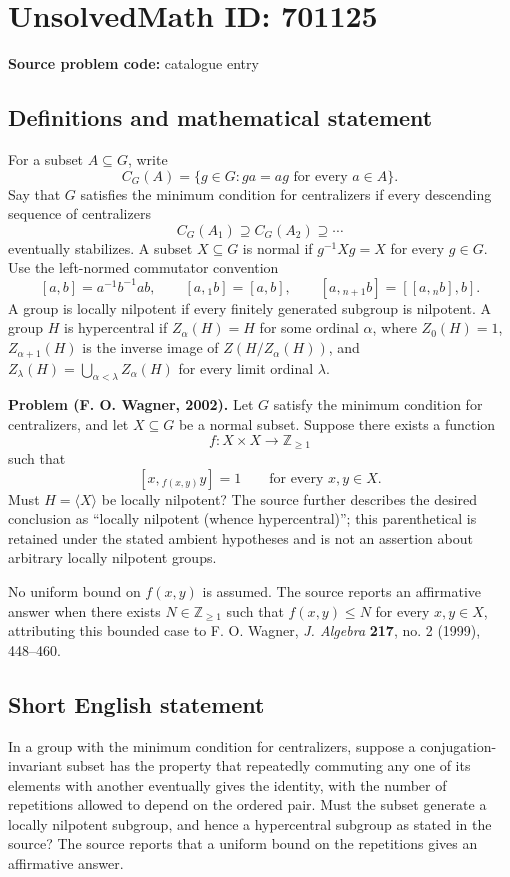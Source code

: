 \documentclass[11pt]{article}
\newcommand{\Z}{\mathbb{Z}}
\begin{document}
\section*{UnsolvedMath ID: 701125}
\textbf{Source problem code:} catalogue entry
\subsection{Definitions and mathematical statement}
For a subset \(A\subseteq G\), write
\[
C_G(A)=\{g\in G:ga=ag\text{ for every }a\in A\}.
\]
Say that \(G\) satisfies the minimum condition for centralizers if every descending sequence of centralizers
\[
C_G(A_1)\supseteq C_G(A_2)\supseteq\cdots
\]
eventually stabilizes. A subset \(X\subseteq G\) is normal if \(g^{-1}Xg=X\) for every \(g\in G\). Use the left-normed commutator convention
\[
[a,b]=a^{-1}b^{-1}ab,\qquad [a,{}_1b]=[a,b],\qquad [a,{}_{n+1}b]=[[a,{}_nb],b].
\]
A group is locally nilpotent if every finitely generated subgroup is nilpotent. A group \(H\) is hypercentral if \(Z_\alpha(H)=H\) for some ordinal \(\alpha\), where \(Z_0(H)=1\), \(Z_{\alpha+1}(H)\) is the inverse image of \(Z(H/Z_\alpha(H))\), and \(Z_\lambda(H)=\bigcup_{\alpha<\lambda}Z_\alpha(H)\) for every limit ordinal \(\lambda\).

\textbf{Problem (F. O. Wagner, 2002).} Let \(G\) satisfy the minimum condition for centralizers, and let \(X\subseteq G\) be a normal subset. Suppose there exists a function
\[
f:X\times X\longrightarrow\Z_{\geq 1}
\]
such that
\[
[x,{}_{f(x,y)}y]=1\qquad\text{for every }x,y\in X.
\]
Must \(H=\langle X\rangle\) be locally nilpotent? The source further describes the desired conclusion as ``locally nilpotent (whence hypercentral)''; this parenthetical is retained under the stated ambient hypotheses and is not an assertion about arbitrary locally nilpotent groups.

No uniform bound on \(f(x,y)\) is assumed. The source reports an affirmative answer when there exists \(N\in\Z_{\geq1}\) such that \(f(x,y)\leq N\) for every \(x,y\in X\), attributing this bounded case to F. O. Wagner, \emph{J. Algebra} \textbf{217}, no. 2 (1999), 448--460.
\subsection{Short English statement}
In a group with the minimum condition for centralizers, suppose a conjugation-invariant subset has the property that repeatedly commuting any one of its elements with another eventually gives the identity, with the number of repetitions allowed to depend on the ordered pair. Must the subset generate a locally nilpotent subgroup, and hence a hypercentral subgroup as stated in the source? The source reports that a uniform bound on the repetitions gives an affirmative answer.
\end{document}
